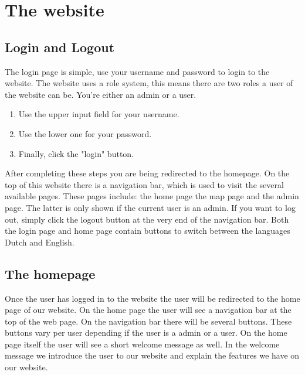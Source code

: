 \documentclass[a4paper]{article}
\begin{document}
\pagebreak

\section{The website}
\subsection{Login and Logout}
The login page is simple, use your username and password to login to the website. The website uses a role system, this means there are two roles a user of the website can be. You're either an admin or a user. 

\begin{enumerate}[wide, labelwidth=!, labelindent=0pt]
	\item Use the upper input field for your username.
	\item Use the lower one for your password.
	\item Finally, click the "login" button.
\end{enumerate}

\noindent


\noindent
After completing these steps you are being redirected to the homepage.
\newline
On the top of this website there is a navigation bar, which is used to visit the several available pages. These pages include: the home page the map page and the admin page. The latter is only shown if the current user is an admin.
\newline
If you want to log out, simply click the logout button at the very end of the navigation bar.
\newline
Both the login page and home page contain buttons to switch between the languages Dutch and English.

\pagebreak

\subsection{The homepage}
Once the user has logged in to the website the user will be redirected to the home page of our website. On the home page the user will see a navigation bar at the top of the web page. On the navigation bar there will be several buttons. These buttons vary per user depending if the user is a admin or a user. 
\newline
\newline
On the home page itself the user will see a short welcome message as well. In the welcome message we introduce the user to our website and explain the features we have on our website. 
\pagebreak
\end{document}

